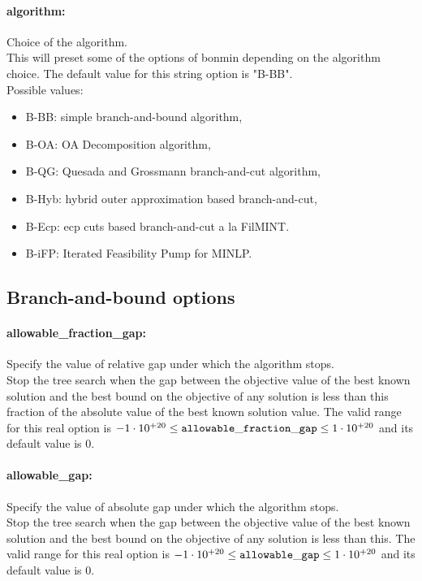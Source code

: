 \paragraph{algorithm:}\label{sec:algorithm} Choice of the algorithm. $\;$ \\
 This will preset some of the options of bonmin
depending on the algorithm choice.
The default value for this string option is "B-BB".
\\ 
Possible values:
\begin{itemize}
   \item B-BB: simple branch-and-bound algorithm,
   \item B-OA: OA Decomposition algorithm,
   \item B-QG: Quesada and Grossmann branch-and-cut algorithm,
   \item B-Hyb: hybrid outer approximation based branch-and-cut,
   \item B-Ecp: ecp cuts based branch-and-cut a la FilMINT.
   \item B-iFP: Iterated Feasibility Pump for MINLP.
\end{itemize}

\subsection{Branch-and-bound options}
\label{sec:Branch-and-bound_options}
\paragraph{allowable\_fraction\_gap:}\label{sec:allowable_fraction_gap} Specify the value of relative gap under which the algorithm stops. $\;$ \\
 Stop the tree search when the gap between the
objective value of the best known solution and
the best bound on the objective of any solution
is less than this fraction of the absolute value
of the best known solution value. The valid range for this real option is 
$-1 \cdot 10^{+20} \le {\tt allowable\_fraction\_gap } \le 1 \cdot 10^{+20}$
and its default value is $0$.


\paragraph{allowable\_gap:}\label{sec:allowable_gap} Specify the value of absolute gap under which the algorithm stops. $\;$ \\
 Stop the tree search when the gap between the
objective value of the best known solution and
the best bound on the objective of any solution
is less than this. The valid range for this real option is 
$-1 \cdot 10^{+20} \le {\tt allowable\_gap } \le 1 \cdot 10^{+20}$
and its default value is $0$.


